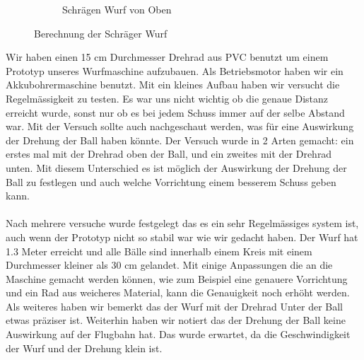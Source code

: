 \begin{figure}[h!]
\begin{subfigure}{.4\textwidth}
		\caption{Schrägen Wurf von Oben}
		\label{fig:Drehrad}
	\end{subfigure}
	\caption{Berechnung der Schräger Wurf}
	\label{Drehrad Versuch}
\end{figure}
Wir haben einen 15 cm Durchmesser Drehrad aus PVC benutzt um einem Prototyp unseres Wurfmaschine  aufzubauen. Als Betriebsmotor haben wir ein Akkubohrermaschine benutzt.
Mit ein kleines Aufbau haben wir versucht die Regelmässigkeit zu testen. Es war uns nicht wichtig ob die genaue Distanz erreicht wurde, sonst nur ob es bei jedem Schuss immer auf der selbe Abstand war. Mit der Versuch sollte auch nachgeschaut werden, was für eine Auswirkung der Drehung der Ball haben könnte. Der Versuch wurde in 2 Arten gemacht: ein erstes mal mit der Drehrad oben der Ball, und ein zweites mit der Drehrad unten. Mit diesem Unterschied es ist möglich der Auswirkung der Drehung der Ball zu festlegen und auch welche Vorrichtung einem besserem Schuss geben kann.\\ \\
Nach mehrere versuche wurde festgelegt das es ein sehr Regelmässiges system ist, auch wenn der Prototyp nicht so stabil war wie wir gedacht haben. Der Wurf hat 1.3 Meter erreicht und alle Bälle sind innerhalb einem Kreis mit einem Durchmesser kleiner als 30 cm gelandet. Mit einige Anpassungen die an die Maschine gemacht werden können, wie zum Beispiel eine genauere Vorrichtung und ein Rad aus weicheres Material, kann die Genauigkeit noch erhöht werden.\\ Als weiteres haben wir bemerkt das der Wurf mit der Drehrad Unter der Ball etwas präziser ist. Weiterhin haben wir notiert das der Drehung der Ball keine Auswirkung auf der Flugbahn hat. Das wurde erwartet, da die Geschwindigkeit der Wurf und der Drehung klein ist. \\

